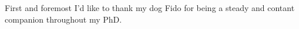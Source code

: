 %

First and foremost I'd like to thank my dog Fido for being a steady and contant companion throughout my PhD.